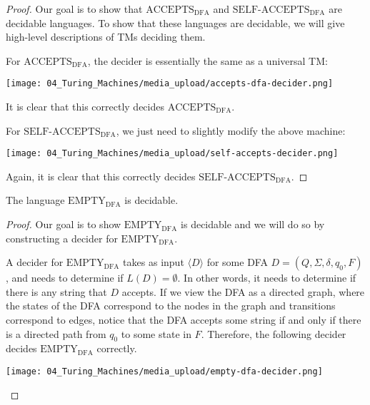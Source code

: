 \begin{proof}
\label{prf:Turing-Machines::goal}
Our goal is to show that $\mathrm{ACCEPTS}_\mathrm{DFA}$ and $\mathrm{SELF}$-$\mathrm{ACCEPTS}_\mathrm{DFA}$ are decidable languages. To show that these languages are decidable, we will give high-level descriptions of TMs deciding them. 

For $\text{ACCEPTS}_\text{DFA}$, the decider is essentially the same as a universal TM:
\begin{center}
    \texttt{[image: 04\_Turing\_Machines/media\_upload/accepts-dfa-decider.png]}
\end{center}
It is clear that this correctly decides $\text{ACCEPTS}_\text{DFA}$. 

For $\text{SELF-ACCEPTS}_\text{DFA}$, we just need to slightly modify the above machine:
\begin{center}
    \texttt{[image: 04\_Turing\_Machines/media\_upload/self-accepts-decider.png]}
\end{center}
Again, it is clear that this correctly decides $\text{SELF-ACCEPTS}_\text{DFA}$.

\end{proof}

\begin{theorem}
\label{theorem:textEMPTY-textDFA-is-decidable}
The language $\mathrm{EMPTY}_\mathrm{DFA}$ is decidable.

\end{theorem}

\begin{proof}
\label{prf:Turing-Machines::show}
Our goal is to show $\mathrm{EMPTY}_\mathrm{DFA}$ is decidable and we will do so by constructing a decider for $\mathrm{EMPTY}_\mathrm{DFA}$. 

A decider for $\mathrm{EMPTY}_\mathrm{DFA}$ takes as input $\langle D \rangle$ for some DFA $D = (Q, \Sigma, \delta, q_0, F)$, and needs to determine if $L(D) = \emptyset$. In other words, it needs to determine if there is any string that $D$ accepts. If we view the DFA as a directed graph, where the states of the DFA correspond to the nodes in the graph and transitions correspond to edges, notice that the DFA accepts some string if and only if there is a directed path from $q_0$ to some state in $F$. Therefore, the following decider decides $\mathrm{EMPTY}_\mathrm{DFA}$ correctly.
\begin{center}
    \texttt{[image: 04\_Turing\_Machines/media\_upload/empty-dfa-decider.png]}
\end{center}

\end{proof}

